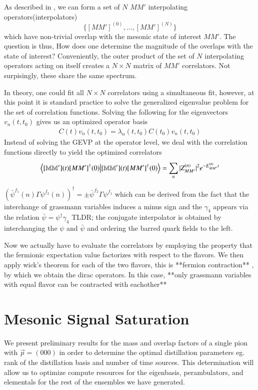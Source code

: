 As described in , we can form a set of $N$ $MM'$ interpolating operators(interpolators) $$\{[MM']^{(0)},\dots,[MM']^{(N)}\}$$ which have non-trivial overlap with the mesonic state of interest $MM'$. The question is thus, How does one determine the magnitude of the overlaps with the state of interest? Conveniently, the outer product of the set of $N$ interpolating operators acting on itself creates a $N \times N$ matrix of $MM'$ correlators. Not surpisingly, these share the same spectrum. 

In theory, one could fit all $N \times N$ correlators using a simultaneous fit, however, at this point it is standard practice to solve the generalized eigenvalue problem for the set of correlation functions. Solving the following for the eigenvectors $v_n(t,t_0)$ gives us an optimized operator basis
\begin{align}
    C(t)v_n(t,t_0) = \lambda_n(t,t_0)C(t_0)v_n(t,t_0)
\end{align}
Instead of solving the GEVP at the operator level, we deal with the correlation functions directly to yield the optimized correlators 
\begin{align}
    \braket{[\mathbb{MM'}](t) [MM']^\dagger(0)} = \sum_{n}^{} |Z_{MM'}^{(n)}|^2 e^{-E_{MM'}^{(n)}t} 
\end{align}


$(\bar{\psi}^{f_1}(n)\Gamma\psi^{f_2}(n))^{\dagger} = \pm \bar{\psi}^{f_2} \Gamma \psi^{f_1}$
which can be derived from the fact that the interchange of grassmann variables induces a minus sign and the $\gamma_4$ appears via the relation $\bar{\psi} = \psi^{\dagger}\gamma_4$
TLDR; the conjugate interpolator is obtained by interchanging the $\psi$ and $\bar{\psi}$ and ordering the barred quark fields to the left. 

Now we actually have to evaluate the correlators by employing the property that the fermionic expectation value factorizes with respect to the flavors. We then apply wick's theorem for each of the two flavors, this is **fermion contraction** , by which we obtain the dirac operators. In this case, **only grassmann variables with equal flavor can be contracted with eachother** 

\section{Mesonic Signal Saturation}

We present preliminary results for the mass and overlap factors of a single pion with $\vec{p} = (000)$ in order to determine the optimal distillation parameters eg. rank of the distillation basis and number of time sources. This determination will allow us to optimize compute resources for the eigenbasis, perambulators, and elementals for the rest of the ensembles  we have generated. 
